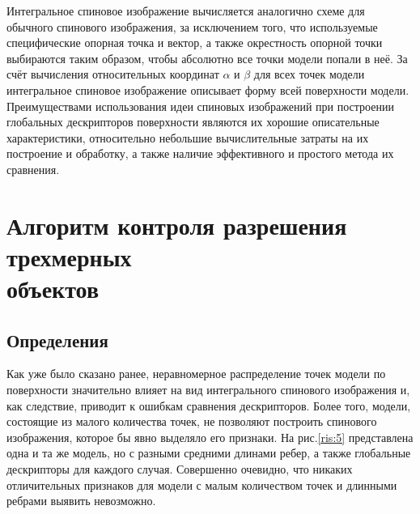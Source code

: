 \documentclass[14pt]{article}
\numberwithin{figure}{section}
\numberwithin{equation}{section}
\begin{document}
Интегральное спиновое изображение вычисляется аналогично схеме для обычного спинового изображения, за исключением того, что используемые специфические опорная точка и вектор, а также окрестность опорной точки выбираются таким образом, чтобы абсолютно все точки модели попали в неё. За счёт вычисления относительных координат $\alpha$ и $\beta$ для всех точек модели интегральное спиновое изображение описывает форму всей поверхности модели. Преимуществами использования идеи спиновых изображений при построении глобальных дескрипторов поверхности являются их хорошие описательные характеристики, относительно небольшие вычислительные затраты на их построение и обработку, а также наличие эффективного и простого метода их сравнения.
\newpage

\section{Алгоритм контроля разрешения трехмерных \\ объектов}\label{sect2}

\subsection{Определения}

Как уже было сказано ранее, неравномерное распределение точек модели по поверхности значительно влияет на вид интегрального спинового изображения и, как следствие, приводит к ошибкам сравнения дескрипторов. Более того, модели, состоящие из малого количества точек, не позволяют построить спинового изображения, которое бы явно выделяло его признаки. На рис.\ref{ris:5} представлена одна и та же модель, но с разными средними длинами ребер, а также глобальные дескрипторы для каждого случая. Совершенно очевидно, что никаких отличительных признаков для модели с малым количеством точек и длинными ребрами выявить невозможно.
\end{document}
